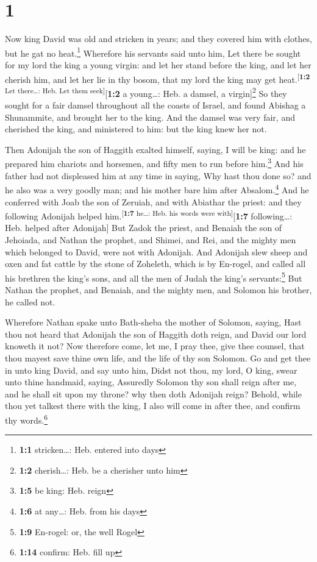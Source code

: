 \hypertarget{section}{%
\section{1}\label{section}}

 Now king David was old and stricken in years; and they
covered him with clothes, but he gat no heat.\footnote{\textbf{1:1}
  stricken\ldots: Heb. entered into days}  Wherefore his
servants said unto him, Let there be sought for my lord the king a young
virgin: and let her stand before the king, and let her cherish him, and
let her lie in thy bosom, that my lord the king may get
heat.\textsuperscript{{[}\textbf{1:2} Let there\ldots: Heb. Let them
seek{]}}{[}\textbf{1:2} a young\ldots: Heb. a damsel, a
virgin{]}\footnote{\textbf{1:2} cherish\ldots: Heb. be a cherisher unto
  him}  So they sought for a fair damsel throughout all
the coasts of Israel, and found Abishag a Shunammite, and brought her to
the king.  And the damsel was very fair, and cherished the
king, and ministered to him: but the king knew her not.

 Then Adonijah the son of Haggith exalted himself, saying,
I will be king: and he prepared him chariots and horsemen, and fifty men
to run before him.\footnote{\textbf{1:5} be king: Heb. reign}
 And his father had not displeased him at any time in
saying, Why hast thou done so? and he also was a very goodly man; and
his mother bare him after Absalom.\footnote{\textbf{1:6} at any\ldots:
  Heb. from his days}  And he conferred with Joab the son
of Zeruiah, and with Abiathar the priest: and they following Adonijah
helped him.\textsuperscript{{[}\textbf{1:7} he\ldots: Heb. his words
were with{]}}{[}\textbf{1:7} following\ldots: Heb. helped after
Adonijah{]}  But Zadok the priest, and Benaiah the son of
Jehoiada, and Nathan the prophet, and Shimei, and Rei, and the mighty
men which belonged to David, were not with Adonijah.  And
Adonijah slew sheep and oxen and fat cattle by the stone of Zoheleth,
which is by En-rogel, and called all his brethren the king's sons, and
all the men of Judah the king's servants:\footnote{\textbf{1:9}
  En-rogel: or, the well Rogel}  But Nathan the prophet,
and Benaiah, and the mighty men, and Solomon his brother, he called not.

 Wherefore Nathan spake unto Bath-sheba the mother of
Solomon, saying, Hast thou not heard that Adonijah the son of Haggith
doth reign, and David our lord knoweth it not?  Now
therefore come, let me, I pray thee, give thee counsel, that thou mayest
save thine own life, and the life of thy son Solomon.  Go
and get thee in unto king David, and say unto him, Didst not thou, my
lord, O king, swear unto thine handmaid, saying, Assuredly Solomon thy
son shall reign after me, and he shall sit upon my throne? why then doth
Adonijah reign?  Behold, while thou yet talkest there
with the king, I also will come in after thee, and confirm thy
words.\footnote{\textbf{1:14} confirm: Heb. fill up}

